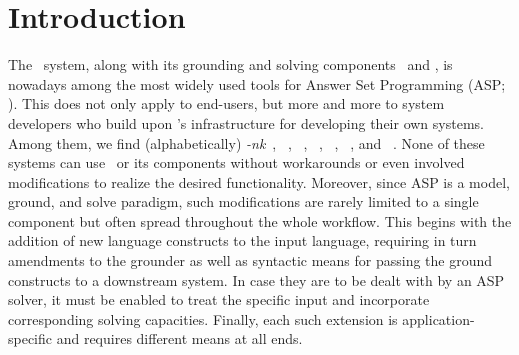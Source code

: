 
\section{Introduction}\label{sec:introduction}

The \clingo\ system, along with its grounding and solving components \gringo\ and \clasp, %
is  nowadays among the most widely used tools for Answer Set Programming (ASP; \cite{lifschitz08b}).
This does not only apply to end-users, but more and more to system developers who build upon \clingo's
infrastructure for developing their own systems.
Among them, we find (alphabetically)
\clasp\emph{-nk}~\cite{eiererfi13a},
\clingcon~\cite{ostsch12a},
\dflat~\cite{abblchduhewo14a},
\dingo~\cite{jalini11a},
\dlvhex~\cite{eifikrre12a},
\inca~\cite{drewal12a}, and
\mingo~\cite{lijani12a}.
None of these systems can use \clingo\ or its components without workarounds or even involved modifications to realize the desired functionality.
%
Moreover, since ASP is a model, ground, and solve paradigm, such modifications are rarely limited to a single component
but often spread throughout the whole workflow.
This begins with the addition of new language constructs to the input language,
requiring in turn amendments to the grounder as well as
syntactic means for passing the ground constructs to a downstream system.
In case they are to be dealt with by an ASP solver,
it must be enabled to treat the specific input and incorporate corresponding solving capacities.
%
Finally,
each such extension is application-specific and requires different means at all ends.

